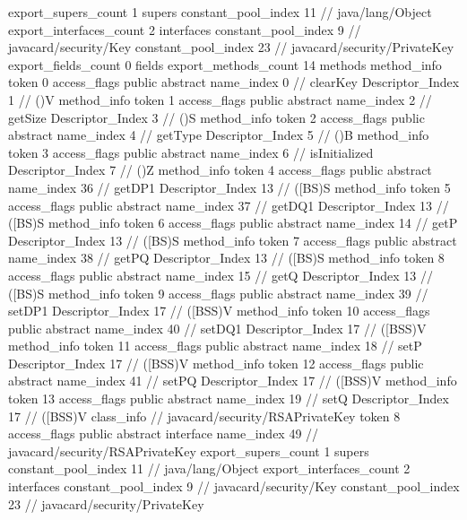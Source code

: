 {{{			export_supers_count	1
			supers {
				constant_pool_index	11		// java/lang/Object
			}
			export_interfaces_count	2
			interfaces {
				constant_pool_index	9		// javacard/security/Key
				constant_pool_index	23		// javacard/security/PrivateKey
			}
			export_fields_count	0
			fields {
			}
			export_methods_count	14
			methods {
				method_info {
					token	0
					access_flags	public abstract
					name_index	0		// clearKey
					Descriptor_Index	1		// ()V
				}
				method_info {
					token	1
					access_flags	public abstract
					name_index	2		// getSize
					Descriptor_Index	3		// ()S
				}
				method_info {
					token	2
					access_flags	public abstract
					name_index	4		// getType
					Descriptor_Index	5		// ()B
				}
				method_info {
					token	3
					access_flags	public abstract
					name_index	6		// isInitialized
					Descriptor_Index	7		// ()Z
				}
				method_info {
					token	4
					access_flags	public abstract
					name_index	36		// getDP1
					Descriptor_Index	13		// ([BS)S
				}
				method_info {
					token	5
					access_flags	public abstract
					name_index	37		// getDQ1
					Descriptor_Index	13		// ([BS)S
				}
				method_info {
					token	6
					access_flags	public abstract
					name_index	14		// getP
					Descriptor_Index	13		// ([BS)S
				}
				method_info {
					token	7
					access_flags	public abstract
					name_index	38		// getPQ
					Descriptor_Index	13		// ([BS)S
				}
				method_info {
					token	8
					access_flags	public abstract
					name_index	15		// getQ
					Descriptor_Index	13		// ([BS)S
				}
				method_info {
					token	9
					access_flags	public abstract
					name_index	39		// setDP1
					Descriptor_Index	17		// ([BSS)V
				}
				method_info {
					token	10
					access_flags	public abstract
					name_index	40		// setDQ1
					Descriptor_Index	17		// ([BSS)V
				}
				method_info {
					token	11
					access_flags	public abstract
					name_index	18		// setP
					Descriptor_Index	17		// ([BSS)V
				}
				method_info {
					token	12
					access_flags	public abstract
					name_index	41		// setPQ
					Descriptor_Index	17		// ([BSS)V
				}
				method_info {
					token	13
					access_flags	public abstract
					name_index	19		// setQ
					Descriptor_Index	17		// ([BSS)V
				}
			}
		}
		class_info {		// javacard/security/RSAPrivateKey
			token	8
			access_flags	public abstract interface
			name_index	49		// javacard/security/RSAPrivateKey
			export_supers_count	1
			supers {
				constant_pool_index	11		// java/lang/Object
			}
			export_interfaces_count	2
			interfaces {
				constant_pool_index	9		// javacard/security/Key
				constant_pool_index	23		// javacard/security/PrivateKey
}}}}
